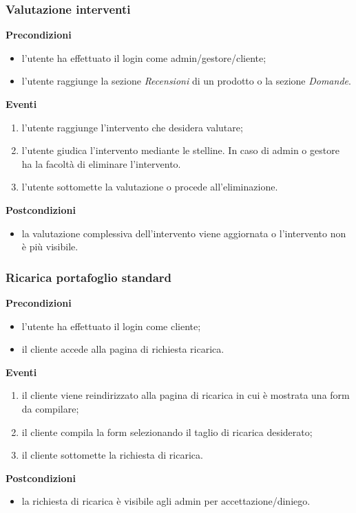 \documentclass[a4paper, 14pt]{article}
\begin{document}
\begin{flushleft}
			\bigskip
			\subsubsection{Valutazione interventi}
			\textbf{Precondizioni}
			\begin{itemize}
				\item l'utente ha effettuato il login come admin/gestore/cliente;
				\item l'utente raggiunge la sezione \textit{Recensioni} di un prodotto o la sezione \textit{Domande}.
			\end{itemize}
			\textbf{Eventi}
			\begin{enumerate}
				\item l'utente raggiunge l'intervento che desidera valutare;
				\item l'utente giudica l'intervento mediante le stelline. In caso di admin o gestore ha la facoltà di eliminare l'intervento.
				\item l'utente sottomette la valutazione o procede all'eliminazione.
			\end{enumerate}
			\textbf{Postcondizioni}
			\begin{itemize}
				\item la valutazione complessiva dell'intervento viene aggiornata o l'intervento non è più visibile.
			\end{itemize}
		
			\bigskip
			\subsubsection{Ricarica portafoglio standard}
			\textbf{Precondizioni}
			\begin{itemize}
				\item l'utente ha effettuato il login come cliente;
				\item il cliente accede alla pagina di richiesta ricarica.
			\end{itemize}
			\textbf{Eventi}
			\begin{enumerate}
				\item il cliente viene reindirizzato alla pagina di ricarica in cui è mostrata una form da compilare;
				\item il cliente compila la form selezionando il taglio di ricarica desiderato;
				\item il cliente sottomette la richiesta di ricarica.
			\end{enumerate}
			\textbf{Postcondizioni}
			\begin{itemize}
				\item la richiesta di ricarica è visibile agli admin per accettazione/diniego.
			\end{itemize}
		

\end{flushleft}
\end{document}
